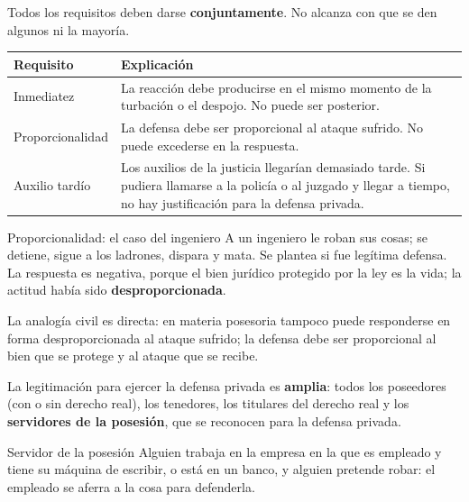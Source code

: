 \documentclass[12pt,oneside]{book}
\begin{document}
\begin{importante}
Todos los requisitos deben darse \textbf{conjuntamente}. No alcanza con que se den algunos ni la mayoría.
\end{importante}

\begin{table}[H]
\centering
\begin{tabularx}{\textwidth}{@{}>{\raggedright\arraybackslash}p{}>{\raggedright\arraybackslash}X@{}}
\toprule
\textbf{Requisito} & \textbf{Explicación} \\
\midrule
Inmediatez & La reacción debe producirse en el mismo momento de la turbación o el despojo. No puede ser posterior. \\
Proporcionalidad & La defensa debe ser proporcional al ataque sufrido. No puede excederse en la respuesta. \\
Auxilio tardío & Los auxilios de la justicia llegarían demasiado tarde. Si pudiera llamarse a la policía o al juzgado y llegar a tiempo, no hay justificación para la defensa privada. \\
\bottomrule
\end{tabularx}
\end{table}

\begin{ejemplo}{Proporcionalidad: el caso del ingeniero}
A un ingeniero le roban sus cosas; se detiene, sigue a los ladrones, dispara y mata. Se plantea si fue legítima defensa. La respuesta es negativa, porque el bien jurídico protegido por la ley es la vida; la actitud había sido \textbf{desproporcionada}.
\end{ejemplo}

La analogía civil es directa: en materia posesoria tampoco puede responderse en forma desproporcionada al ataque sufrido; la defensa debe ser proporcional al bien que se protege y al ataque que se recibe.

La legitimación para ejercer la defensa privada es \textbf{amplia}: todos los poseedores (con o sin derecho real), los tenedores, los titulares del derecho real y los \textbf{servidores de la posesión}, que se reconocen para la defensa privada.

\begin{ejemplo}{Servidor de la posesión}
Alguien trabaja en la empresa en la que es empleado y tiene su máquina de escribir, o está en un banco, y alguien pretende robar: el empleado se aferra a la cosa para defenderla.
\end{ejemplo}
\end{document}
